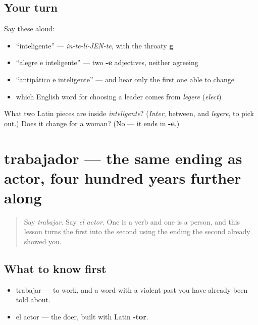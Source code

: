 \subsection*{Your turn}
Say these aloud:

\begin{itemize}
\raggedright
  \item \textquotedblleft{}inteligente\textquotedblright{} — \emph{in-te-li-JEN-te}, with the throaty \textbf{g}
  \item \textquotedblleft{}alegre e inteligente\textquotedblright{} — two \textbf{-e} adjectives, neither agreeing
  \item \textquotedblleft{}antipático e inteligente\textquotedblright{} — and hear only the first one able to change
  \item which English word for choosing a leader comes from \emph{legere} (\emph{elect})
\end{itemize}

\begin{tcolorbox}[breakable,colback=teal!4,colframe=teal!35!black,title={Before you move on}]
What two Latin pieces are inside \emph{inteligente}? (\emph{Inter}, between, and \emph{legere}, to pick out.) Does it change for a woman? (No — it ends in \textbf{-e}.)
\end{tcolorbox}
\section[trabajador]{trabajador — the same ending as actor, four hundred years further along}

\label{lesson:ES-C423-trabajador}



\begin{quote}
Say \emph{trabajar}. Say \emph{el actor}. One is a verb and one is a person, and this lesson turns the first into the second using the ending the second already showed you.
\end{quote}

\subsection*{What to know first}
\begin{itemize}
\raggedright
  \item trabajar — to work, and a word with a violent past you have already been told about.
  \item el actor — the doer, built with Latin \textbf{-tor}.
\end{itemize}

